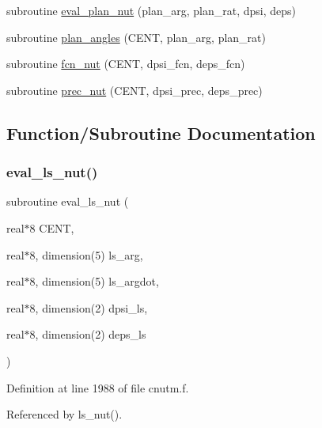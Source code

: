 \begin{DoxyCompactItemize}
\item 
subroutine \hyperlink{cnutm_8f_a0ca2f13c89d460ae03ee66677125e069}{eval\+\_\+plan\+\_\+nut} (plan\+\_\+arg, plan\+\_\+rat, dpsi, deps)
\item 
subroutine \hyperlink{cnutm_8f_ade23a11bbee6fe4b73da3991da418251}{plan\+\_\+angles} (C\+E\+NT, plan\+\_\+arg, plan\+\_\+rat)
\item 
subroutine \hyperlink{cnutm_8f_ab1a366d14b0c9f128a2d73fee2bc2426}{fcn\+\_\+nut} (C\+E\+NT, dpsi\+\_\+fcn, deps\+\_\+fcn)
\item 
subroutine \hyperlink{cnutm_8f_a7ffa7e081dadaf0ed066f4a2776b47bb}{prec\+\_\+nut} (C\+E\+NT, dpsi\+\_\+prec, deps\+\_\+prec)
\end{DoxyCompactItemize}


\subsection{Function/\+Subroutine Documentation}
\mbox{\label{cnutm_8f_a68c7e27fb3948f58df8aeeb580be43f4}} 
\subsubsection{\texorpdfstring{eval\+\_\+ls\+\_\+nut()}{eval\_ls\_nut()}}
{\footnotesize\ttfamily subroutine eval\+\_\+ls\+\_\+nut (\begin{DoxyParamCaption}\item[{real$\ast$8}]{C\+E\+NT,  }\item[{real$\ast$8, dimension(5)}]{ls\+\_\+arg,  }\item[{real$\ast$8, dimension(5)}]{ls\+\_\+argdot,  }\item[{real$\ast$8, dimension(2)}]{dpsi\+\_\+ls,  }\item[{real$\ast$8, dimension(2)}]{deps\+\_\+ls }\end{DoxyParamCaption})}



Definition at line 1988 of file cnutm.\+f.



Referenced by ls\+\_\+nut().

\mbox{\label{cnutm_8f_a0ca2f13c89d460ae03ee66677125e069}} 
